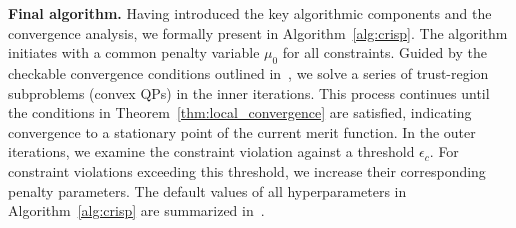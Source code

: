 \textbf{Final algorithm.}
Having introduced the key algorithmic components and the convergence analysis, we formally present \crisp in Algorithm~\ref{alg:crisp}. 
The algorithm initiates with a common penalty variable $\mu_0$ for all constraints. Guided by the checkable convergence conditions outlined in~, we solve a series of trust-region subproblems (convex QPs) in the inner iterations. This process continues until the conditions in Theorem~\ref{thm:local_convergence} are satisfied, indicating convergence to a stationary point of the current merit function. 
In the outer iterations, we examine the constraint violation against a threshold $\epsilon_c$. For constraint violations exceeding this threshold, we increase their corresponding penalty parameters.
The default values of all hyperparameters in Algorithm~\ref{alg:crisp} are summarized in~.




